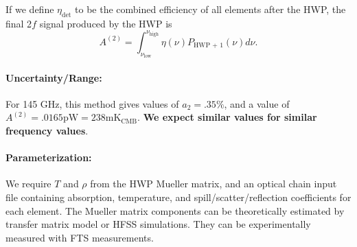 If we define $\eta_\text{det}$ to be the combined efficiency of all elements after the HWP,
the final 2$f$ signal produced by the HWP is 
\[
A^{(2)} = \int_{\nu_\text{low}}^{\nu_\text{high}} \eta(\nu) P_\text{HWP + 1}(\nu) d\nu.
\]
\paragraph{Uncertainty/Range:}
For 145 GHz, this method gives values of $a_2 = .35\%$, and a value of 
$A^{(2)} = .0165 \text{pW} = 238 \text{mK}_\text{CMB}$. 
\textbf{We expect similar values for similar frequency values}.

\paragraph{Parameterization:}
We require $T$ and $\rho$ from the HWP Mueller matrix\cite{Salatino16}, and an optical chain input file containing
absorption, temperature, and spill/scatter/reflection coefficients for each element. The Mueller matrix components can be theoretically estimated by transfer matrix model \cite{Essinger-Hileman13} or HFSS simulations. They can be experimentally measured with FTS measurements.

